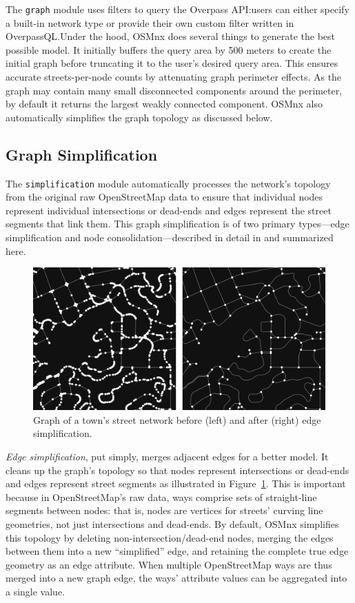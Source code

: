 \documentclass[12pt,letterpaper]{article} %
\begin{document}
The \texttt{graph} module uses filters to query the Overpass API:\@ users can either specify a built-in network type or provide their own custom filter written in OverpassQL.\@ Under the hood, OSMnx does several things to generate the best possible model. It initially buffers the query area by 500 meters to create the initial graph before truncating it to the user's desired query area. This ensures accurate streets-per-node counts by attenuating graph perimeter effects. As the graph may contain many small disconnected components around the perimeter, by default it returns the largest weakly connected component. OSMnx also automatically simplifies the graph topology as discussed below.

\subsection{Graph Simplification}

The \texttt{simplification} module automatically processes the network's topology from the original raw OpenStreetMap data to ensure that individual nodes represent individual intersections or dead-ends and edges represent the street segments that link them. This graph simplification is of two primary types---edge simplification and node consolidation---described in detail in \citet{boeing_graph_2024} and summarized here.

\begin{figure}[tbp]
    \centering
    \includegraphics[width=1\textwidth]{fig_graph_simplification.png}
    \caption{Graph of a town's street network before (left) and after (right) edge simplification.}\label{fig:graph_simplification}
\end{figure}

\textit{Edge simplification}, put simply, merges adjacent edges for a better model. It cleans up the graph's topology so that nodes represent intersections or dead-ends and edges represent street segments as illustrated in Figure~\ref{fig:graph_simplification}. This is important because in OpenStreetMap's raw data, ways comprise sets of straight-line segments between nodes: that is, nodes are vertices for streets' curving line geometries, not just intersections and dead-ends. By default, OSMnx simplifies this topology by deleting non-intersection/dead-end nodes, merging the edges between them into a new \enquote{simplified} edge, and retaining the complete true edge geometry as an edge attribute. When multiple OpenStreetMap ways are thus merged into a new graph edge, the ways' attribute values can be aggregated into a single value.
\end{document}
